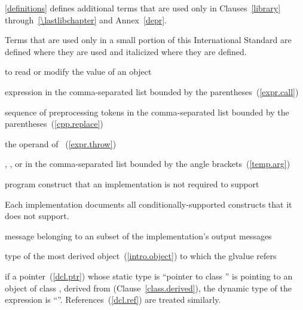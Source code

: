 \pnum
\ref{definitions}
defines additional terms that are used only in Clauses~\ref{library}
through~\ref{\lastlibchapter} and Annex~\ref{depr}.

\pnum
Terms that are used only in a small portion of this International
Standard are defined where they are used and italicized where they are
defined.

%
 to read or modify the value of an object

%
 expression in the
comma-separated list bounded by the parentheses~(\ref{expr.call})

%
%
 sequence of preprocessing tokens in the
comma-separated list bounded by the parentheses~(\ref{cpp.replace})

%
%
 the operand of ~(\ref{expr.throw})

%
%
,
, or
 in the comma-separated
list bounded by the angle brackets~(\ref{temp.arg})

%
program construct that an implementation is not required to support\\
\begin{note} Each implementation documents all conditionally-supported
constructs that it does not support.\end{note}

%
message belonging to an  subset of the
implementation's output messages

%
 type of the most derived object~(\ref{intro.object}) to which the
glvalue refers\\
\begin{example}
if a pointer~(\ref{dcl.ptr})  whose static type is ``pointer to
class '' is pointing to an object of class , derived
from  (Clause~\ref{class.derived}), the dynamic type of the
expression  is ``''. References~(\ref{dcl.ref}) are
treated similarly.
\end{example}

